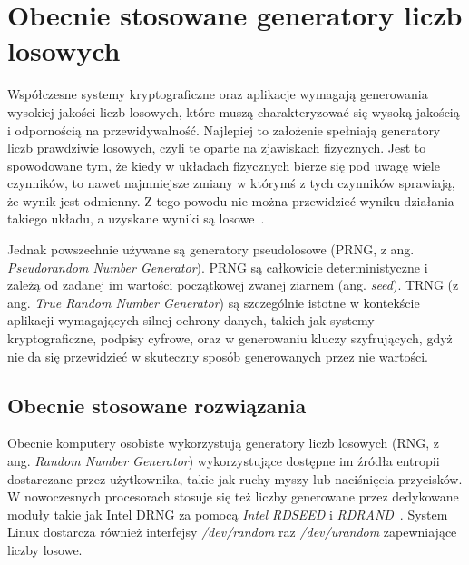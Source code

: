 \chapter{Obecnie stosowane generatory liczb losowych}\label{ch:przeglad-rynku}

Współczesne systemy kryptograficzne oraz aplikacje wymagają generowania wysokiej jakości liczb losowych,
które muszą charakteryzować się wysoką jakością i odpornością na przewidywalność.
Najlepiej to założenie spełniają generatory liczb prawdziwie losowych, czyli te oparte na zjawiskach fizycznych.
Jest to spowodowane tym, że kiedy w układach fizycznych bierze się pod uwagę wiele czynników, to nawet najmniejsze zmiany
w którymś z tych czynników sprawiają, że wynik jest odmienny.
Z tego powodu nie można przewidzieć wyniku działania takiego układu, a uzyskane wyniki są losowe~\cite{chaos}.

Jednak powszechnie używane są generatory pseudolosowe (PRNG, z ang. \textit{Pseudorandom Number Generator}).
PRNG są całkowicie deterministyczne i zależą od zadanej im wartości początkowej zwanej ziarnem (ang. \textit{seed}).
TRNG (z ang. \textit{True Random Number Generator}) są szczególnie istotne w kontekście aplikacji wymagających silnej 
ochrony danych, takich jak systemy kryptograficzne, podpisy cyfrowe, oraz w generowaniu kluczy szyfrujących,
gdyż nie da się przewidzieć w skuteczny sposób generowanych przez nie wartości.

\section{Obecnie stosowane rozwiązania}\label{sec:obecnie-stosowane-rozwiazania}

Obecnie komputery osobiste wykorzystują generatory liczb losowych (RNG, z ang. \textit{Random Number Generator})
wykorzystujące dostępne im źródła entropii dostarczane przez użytkownika, takie jak ruchy myszy lub naciśnięcia przycisków.
W nowoczesnych procesorach stosuje się też liczby generowane przez dedykowane moduły takie jak Intel DRNG za pomocą \textit{Intel RDSEED} i \textit{RDRAND}~\cite{IntelRD}.
System Linux dostarcza również interfejsy \textit{/dev/random} raz \textit{/dev/urandom} zapewniające liczby losowe.



